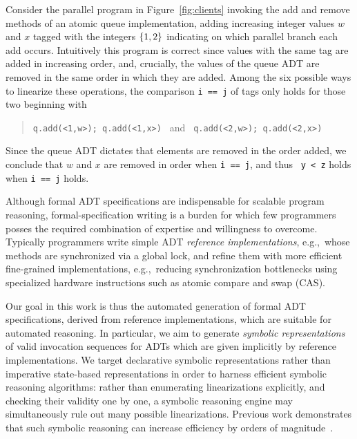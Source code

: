 \begin{example}

  Consider the parallel program in Figure~\ref{fig:clients} invoking the add and
  remove methods of an atomic queue implementation, adding increasing integer
  values $w$ and $x$ tagged with the integers ${\{{1,2}\}}$ indicating on which
  parallel branch each add occurs. Intuitively this program is correct since
  values with the same tag are added in increasing order, and, crucially, the
  values of the queue ADT are removed in the same order in which they are added.
  Among the six possible ways to linearize these operations, the comparison {\tt i ==
  j} of tags only holds for those two beginning with
  \begin{quote}
    \verb|q.add(<1,w>); q.add(<1,x>) | and \verb| q.add(<2,w>); q.add(<2,x>)|
  \end{quote}
  Since the queue ADT dictates that elements are removed in the order added, we
  conclude that $w$ and $x$ are removed in order when {\tt i == j}, and thus {\tt
  y < z} holds when {\tt i == j} holds.
  
\end{example}

Although formal ADT specifications are indispensable for scalable program
reasoning, formal-specification writing is a burden for which few programmers
posses the required combination of expertise and willingness to overcome.
Typically programmers write simple ADT \emph{reference implementations},
e.g.,~whose methods are synchronized via a global lock, and refine them with
more efficient fine-grained implementations, e.g.,~reducing synchronization
bottlenecks using specialized hardware instructions such as atomic compare and
swap (CAS).

Our goal in this work is thus the automated generation of formal ADT
specifications, derived from reference implementations, which are suitable for
automated reasoning. In particular, we aim to generate \emph{symbolic
representations} of valid invocation sequences for ADTs which are given
implicitly by reference implementations. We target declarative symbolic
representations rather than imperative state-based representations in order to
harness efficient symbolic reasoning algorithms: rather than enumerating
linearizations explicitly, and checking their validity one by one, a symbolic
reasoning engine may simultaneously rule out many possible linearizations.
Previous work demonstrates that such symbolic reasoning can increase
efficiency by orders of magnitude~\cite{conf/pldi/EmmiEH15}.

